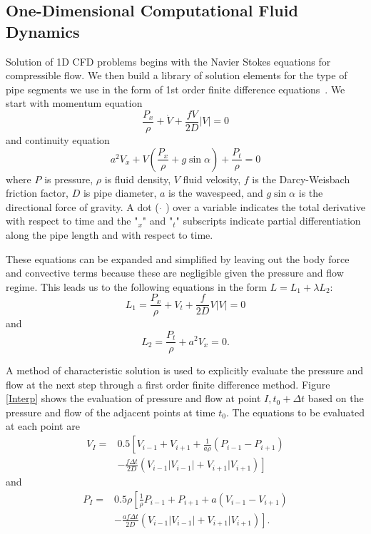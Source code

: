 \subsection{One-Dimensional Computational Fluid Dynamics}
\label{sec:1dcfd}
Solution of 1D CFD problems begins with the Navier Stokes equations for compressible flow.  We then build a library of solution elements for the type of pipe segments we use in the form of 1st order finite difference equations~\cite{SAE1999010915}.  
We start with momentum equation
%
\begin{equation}
\frac{P_x}{\rho}+\dot{V}+\frac{fV}{2D}|V|=0
\end{equation}
% 
and continuity equation 
%
\begin{equation}
a^2V_x+V\left(\frac{P_x}{\rho}+g\sin\alpha\right)+\frac{P_t}{\rho}=0
\end{equation} 
%
where \(P\) is pressure, \(\rho\) is fluid density, \(V\) fluid velosity, \(f\) is the Darcy-Weisbach friction factor, \(D\) is pipe diameter, \(a\) is the wavespeed, and \(g\sin\alpha\) is the directional force of gravity.  A dot ( \(\dot{ }\) ) over a variable indicates the total derivative with respect to time and the "\(_x\)" and "\(_t\)" subscripts indicate partial differentiation along the pipe length and with respect to time. 

These equations can be expanded and simplified by leaving out the body force and convective terms because these are negligible given the pressure and flow regime.  This leads us to the following equations in the form \(L=L_1+\lambda L_2\):  
%
\begin{equation}
L_1=\frac{P_x}{\rho}+V_t+\frac{f}{2D}V|V|=0
\end{equation} 
%
and 
%
\begin{equation}
L_2=\frac{P_t}{\rho}+a^2V_x=0.
\end{equation}

A method of characteristic solution is used to explicitly evaluate the pressure and flow at the next step through a first order finite difference method.  Figure \ref{Interp} 
shows the evaluation of pressure and flow at point \(I, t_0+\Delta t\) based on the pressure and flow of the adjacent points at time \(t_0\).  The equations to be evaluated at each point are
%
\begin{align}
V_{I}= & 0.5\left[V_{i-1}+V_{i+1}+\frac{1}{a\rho}\left(P_{i-1}-P_{i+1}\right) \right. \nonumber \\
	& \left. -\frac{f\Delta t}{2D}\left(V_{i-1}|V_{i-1}|+V_{i+1}|V_{i+1}\right)\right]
\end{align}
%
and
%
\begin{align}
P_{I}= & 0.5\rho \left[\frac{1}{\rho}P_{i-1}+P_{i+1}+a\left(V_{i-1}-V_{i+1}\right) \right. \nonumber \\
	& \left. -\frac{af\Delta t}{2D}\left(V_{i-1}|V_{i-1}|+V_{i+1}|V_{i+1}\right)\right].
\end{align}

